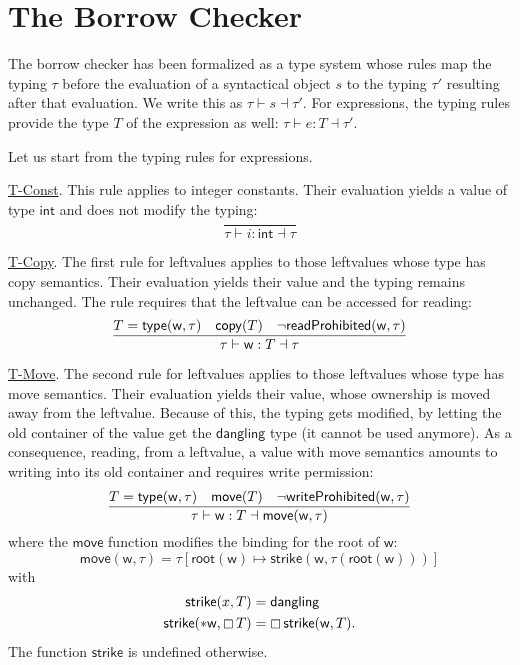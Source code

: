 \section{The Borrow Checker}\label{sec:borrow_checker}

The borrow checker has been formalized as a type system whose rules
map the typing $\tau$ before the evaluation of a syntactical object $s$ to
the typing $\tau'$ resulting after that evaluation.
We write this as $\tau\vdash s\dashv\tau'$.
For expressions, the typing
rules provide the type $T$ of the expression as well:
$\tau\vdash e:T\dashv\tau'$.

Let us start from the typing rules for expressions.

\underline{\textsf{T-Const}}.
This rule applies to integer constants. Their evaluation
yields a value of type $\mathsf{int}$ and does not modify the typing:
\[
\frac
    {}
    {\tau\vdash i:\mathsf{int}\dashv\tau}
\]

\underline{\textsf{T-Copy}}.
The first rule for leftvalues applies to those leftvalues whose type
has copy semantics. Their evaluation yields their value
and the typing remains unchanged. The rule requires that the leftvalue
can be accessed for reading:
\[
\frac
    {T=\mathsf{type}(\mathsf{w},\tau)\quad\mathsf{copy}(T)\quad\neg\mathsf{readProhibited}(\mathsf{w},\tau)}
    {\tau\vdash\mathsf{w}:T\dashv\tau}
\]

\underline{\textsf{T-Move}}.
The second rule for leftvalues applies to those leftvalues whose type
has move semantics. Their evaluation yields their value,
whose ownership is moved away from the leftvalue. Because of this,
the typing gets modified, by letting the old container of the value
get the $\mathsf{dangling}$ type (it cannot be used anymore).
As a consequence, reading, from a leftvalue, a value with move semantics
amounts to writing into its old container and requires write permission:
\[
\frac
    {T=\mathsf{type}(\mathsf{w},\tau)\quad\mathsf{move}(T)\quad\neg\mathsf{writeProhibited}(\mathsf{w},\tau)}
    {\tau\vdash\mathsf{w}:T\dashv\mathsf{move}(\mathsf{w},\tau)}
\]
where the $\mathsf{move}$ function
modifies the binding for the root of $\mathsf{w}$:
\[
\mathsf{move}(\mathsf{w},\tau)=\tau[\mathsf{root}(\mathsf{w})\mapsto
  \mathsf{strike}(\mathsf{w},\tau(\mathsf{root}(\mathsf{w})))]
\]
with
\begin{align*}
  \mathsf{strike}(x,T)&=\mathsf{dangling}\\
  \mathsf{strike}(\mathtt{*}\mathsf{w},\boxempty\,{T})&=
  \boxempty\,{\mathsf{strike}(\mathsf{w},T)}.
\end{align*}
The function $\mathsf{strike}$ is undefined otherwise.

